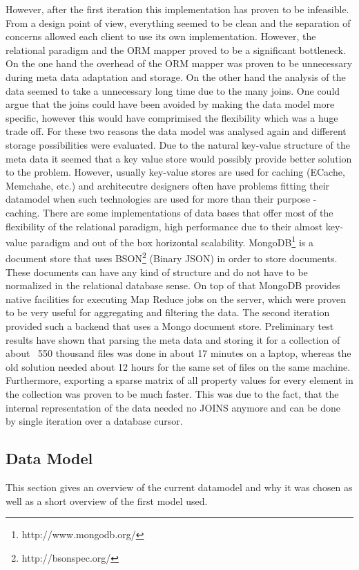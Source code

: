 However, after the first iteration this implementation has proven to be infeasible. From a design point of view, everything seemed to be clean and the separation of concerns allowed each client to use its own implementation. However, the relational paradigm and the ORM mapper proved to be a significant bottleneck. On the one hand the overhead of the ORM mapper was proven to be unnecessary during meta data adaptation and storage. On the other hand the analysis of the data seemed to take a unnecessary long time due to the many joins. One could argue that the joins could have been avoided by making the data model more specific, however this would have comprimised the flexibility which was a huge trade off.
For these two reasons the data model was analysed again and different storage possibilities were evaluated. 
Due to the natural key-value structure of the meta data it seemed that a key value store would possibly provide better solution to the problem. However, usually key-value stores are used for caching (ECache, Memchahe, etc.) and architecutre designers often have problems fitting their datamodel when such technologies are used for more than their purpose - caching.
There are some implementations of data bases that offer most of the flexibility of the relational paradigm, high performance due to their almost key-value paradigm and out of the box horizontal scalability. 
MongoDB\footnote{http://www.mongodb.org/} is a document store that uses BSON\footnote{http://bsonspec.org/} (Binary JSON) in order to store documents. These documents can have any kind of structure and do not have to be normalized in the relational database sense. On top of that MongoDB provides native facilities for executing Map Reduce \cite{Dean:2008:MSD:1327452.1327492} jobs on the server, which were proven to be very useful for aggregating and filtering the data.
The second iteration provided such a backend that uses a Mongo document store. Preliminary test results have shown that parsing the meta data and storing it for a collection of about ~550 thousand files was done in about 17 minutes on a laptop, whereas the old solution needed about 12 hours for the same set of files on the same machine.
Furthermore, exporting a sparse matrix of all property values for every element in the collection was proven to be much faster. This was due to the fact, that the internal representation of the data needed no JOINS anymore and can be done by single iteration over a database cursor.

\subsection{Data Model}
This section gives an overview of the current datamodel and why it was chosen as well as a short overview of the first model used.

